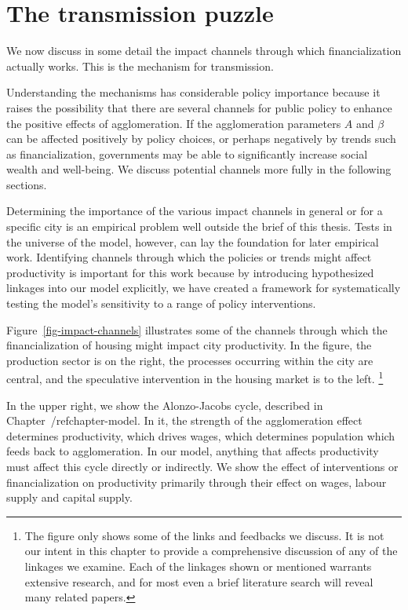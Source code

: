 \section{The transmission puzzle}
We now discuss in some detail the impact channels through which financialization actually works. This is the mechanism for transmission.

Understanding the mechanisms has considerable policy importance because it raises the possibility that there are several channels for public policy to enhance the positive effects of agglomeration. If the agglomeration parameters $A$ and  $\beta$ can be affected positively by policy choices, or perhaps negatively by trends such as financialization,  governments may be able to significantly increase social wealth and well-being. We discuss potential channels more fully in the following sections. 

Determining the importance of the various impact channels in general or for a specific city is an empirical problem well outside the brief of this thesis. Tests in the universe of the model, however, can lay the foundation for later empirical work. Identifying channels through which the policies or trends might affect productivity is important for this work because by introducing hypothesized linkages into our model explicitly, we have created a framework for systematically testing the model's sensitivity to a range of policy interventions. 

Figure~\ref{fig-impact-channels} illustrates some of the channels through which the financialization of housing might impact city productivity. 
In the figure, the production sector is on the right, the processes occurring within the city are central, and the speculative intervention in the housing market is to the left.  \footnote{The figure only shows some of the links and feedbacks we discuss. It is not our intent in this chapter to provide  a comprehensive discussion of any of the linkages we examine. Each of the linkages shown or mentioned warrants extensive research, and for most even a brief literature search will reveal many related papers.} 


In the upper right, we show the \gls{Alonzo-Jacobs cycle}, described in Chapter~/ref{chapter-model}. In it, the strength of the agglomeration effect determines productivity, which drives wages, which determines population which feeds back to agglomeration. In our model, anything that affects productivity must affect this cycle directly or indirectly.  We show the effect of interventions or financialization on productivity primarily through their effect on wages, labour supply and capital supply. %

